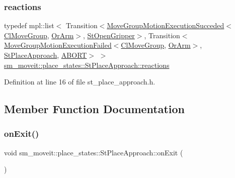 \subsubsection{\texorpdfstring{reactions}{reactions}}
{\footnotesize\ttfamily typedef mpl\+::list$<$ Transition$<$\hyperlink{structmoveit__z__client_1_1MoveGroupMotionExecutionSucceded}{Move\+Group\+Motion\+Execution\+Succeded}$<$\hyperlink{classmoveit__z__client_1_1ClMoveGroup}{Cl\+Move\+Group}, \hyperlink{classsm__moveit_1_1OrArm}{Or\+Arm}$>$, \hyperlink{structsm__moveit_1_1place__states_1_1StOpenGripper}{St\+Open\+Gripper}$>$, Transition$<$\hyperlink{structmoveit__z__client_1_1MoveGroupMotionExecutionFailed}{Move\+Group\+Motion\+Execution\+Failed}$<$\hyperlink{classmoveit__z__client_1_1ClMoveGroup}{Cl\+Move\+Group}, \hyperlink{classsm__moveit_1_1OrArm}{Or\+Arm}$>$, \hyperlink{structsm__moveit_1_1place__states_1_1StPlaceApproach}{St\+Place\+Approach}, \hyperlink{classABORT}{A\+B\+O\+RT}$>$ $>$ \hyperlink{structsm__moveit_1_1place__states_1_1StPlaceApproach_a8532a592c622e84d25b282e727c1f475}{sm\+\_\+moveit\+::place\+\_\+states\+::\+St\+Place\+Approach\+::reactions}}



Definition at line 16 of file st\+\_\+place\+\_\+approach.\+h.



\subsection{Member Function Documentation}
\mbox{\label{structsm__moveit_1_1place__states_1_1StPlaceApproach_a4088322d84e4da8ce35253d2854a3710}} 
\subsubsection{\texorpdfstring{on\+Exit()}{onExit()}}
{\footnotesize\ttfamily void sm\+\_\+moveit\+::place\+\_\+states\+::\+St\+Place\+Approach\+::on\+Exit (\begin{DoxyParamCaption}{ }\end{DoxyParamCaption})\hspace{0.3cm}{\ttfamily [inline]}}



